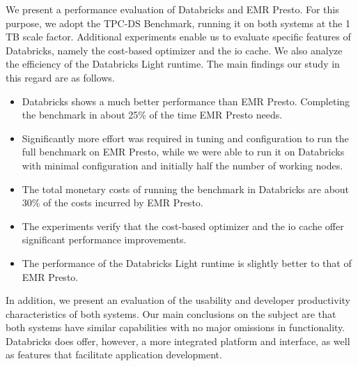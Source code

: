 We present a performance evaluation of Databricks and EMR Presto. For this purpose, we adopt the TPC-DS Benchmark, running it on both systems at the 1 TB scale factor. Additional experiments enable us to evaluate specific features of Databricks, namely the cost-based optimizer and the io cache. We also analyze the efficiency of the Databricks Light runtime. The main findings our study in this regard are as follows.

\begin{itemize}
\item Databricks shows a much better performance than EMR Presto. Completing the benchmark in about 25\% of the time EMR Presto needs.
\item	Significantly more effort was required in tuning and configuration to run the full benchmark on EMR Presto, while we were able to run it on Databricks with minimal configuration and initially half the number of working nodes.
\item	The total monetary costs of running the benchmark in Databricks are about 30\% of the costs incurred by EMR Presto.
\item	The experiments verify that the cost-based optimizer and the io cache offer significant performance improvements.
\item	The performance of the Databricks Light runtime is slightly better to that of EMR Presto.
\end{itemize}
In addition, we present an evaluation of the usability and developer productivity characteristics of both systems. Our main conclusions on the subject are that both systems have similar capabilities with no major omissions in functionality. Databricks does offer, however, a more integrated platform and interface, as well as features that facilitate application development.

